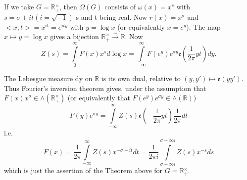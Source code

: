 \subsection{} \label{chap1:sec1:subsec3} %

If we take $G=\mathbb{R}{_+^\times}$, then $\Omega(G)$ consists of
$\omega(x)=x^s$ with $s=\sigma+it(i=\sqrt{-1})$ s and t being
real. Now $r(x)=x^{\sigma}$ and $<x,t>=x^{it}=e^{ity}$ with $y=\log x$
(or equivalently $x=e{^y}$). The map $x\mapsto y=\log x$ gives a
bijection ${\mathbb{R}_+^\times}{\xrightarrow{\sim}}\mathbb{R}$. Now 
\begin{equation*}
  Z(s)=\int\limits_0^\infty F(x)x^sd\log x =
  \int\limits_{-\infty}^\infty F(e^y)e^{\sigma
    y}\mathfrak{e}(\frac{1}{2\pi}yt)dy. 
\end{equation*}

The Lebesgue measure dy on $\mathbb{R}$ is its own dual, relative to
$(y,y')\mapsto \mathfrak{e}(yy')$. Thus Fourier's inversion theorem
gives, under the assumption that $F(x)x^{\sigma}\in
\wedge(\mathbb{R}_+^\times)$ (or equivalently that
$F(e^y)e^{\sigma y}\in\wedge(\mathbb{R}))$
\begin{equation*}
  F(y)e^{\sigma y}= \int\limits_{-\infty}^\infty
  Z(s)\mathfrak{e}(-\frac{1}{2\pi}yt)\frac{1}{2\pi}dt
\end{equation*}
i.e.
\begin{equation*}
  F(x)=\frac{1}{2\pi}\int\limits_{-\infty}^\infty
  Z(s)x^{-\sigma-it}dt=\frac{1}{2\pi i}\int\limits_{\sigma-\infty
    i}^{\sigma+\infty i}Z(s)x^{-s}ds
\end{equation*}
which is just the assertion of the Theorem above for
$G=\mathbb{R}{_+^\times}$.

\subsection{}\label{chap1:sec1:subsec4}%

